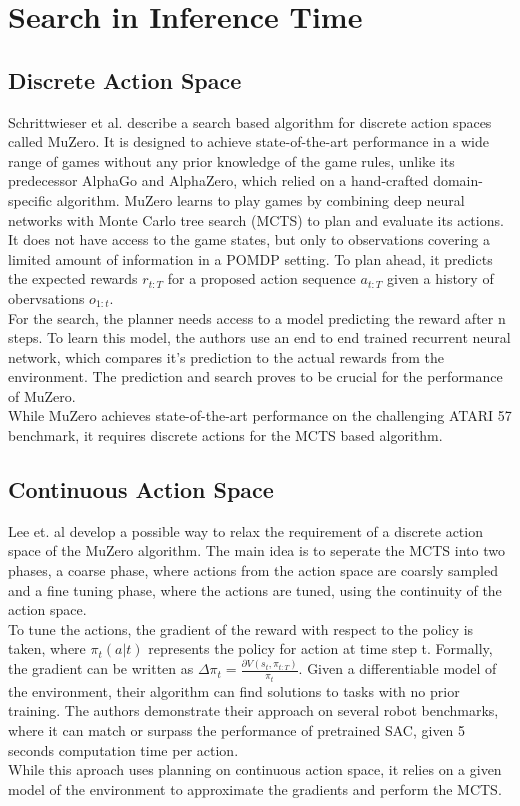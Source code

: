 \section{Search in Inference Time}
\subsection{Discrete Action Space}

Schrittwieser et al. \cite{MUZero} describe a search based algorithm for discrete action spaces called MuZero. It is designed to achieve state-of-the-art performance 
in a wide range of games without any prior knowledge of the game rules, unlike its predecessor AlphaGo and AlphaZero, which relied on a hand-crafted 
domain-specific algorithm. MuZero learns to play games by combining deep neural networks with Monte Carlo tree search (MCTS) to plan and evaluate its actions. 
It does not have access to the game states, but only to observations covering a limited amount of information in a POMDP setting.
To plan ahead, it predicts the expected rewards $r_{t:T}$ for a proposed action sequence $a_{t:T}$ given a history of obervsations $o_{1:t}$.\\
For the search, the planner needs access to a model predicting the reward after n steps. To learn this model, the authors use an end to end trained recurrent neural network, which 
compares it's prediction to the actual rewards from the environment. The prediction and search proves to be crucial for the performance of MuZero.\\ 
While MuZero achieves state-of-the-art performance on the challenging ATARI 57 benchmark, it requires discrete actions for the MCTS based algorithm.

\subsection{Continuous Action Space}
\label{sec:mctsca}
Lee et. al \cite{Lee_Jeon_Kim_Kim_2020} develop a possible way to relax the requirement of a discrete action space of the MuZero algorithm. 
The main idea is to seperate 
the MCTS into two phases, a coarse phase, where actions from the action space are coarsly sampled and a fine tuning phase, where the actions are tuned, using the continuity of the action space.\\
To tune the actions, the gradient of the reward with respect to the policy is taken, where $\pi_t(a|t)$ represents the policy for action at time step t. 
Formally, the gradient can be written as $\Delta \pi_t = \frac{\partial V (s_t, \pi_{t:T})}{\pi_{t}}$. Given a differentiable model of the environment, their algorithm can 
find solutions to tasks with no prior training. The authors demonstrate their approach on several robot 
benchmarks, where it can match or surpass the performance of pretrained SAC, given 5 seconds computation time per action.\\
While this aproach uses planning on continuous action space, it relies on a given model of the environment to approximate the gradients and perform the MCTS.